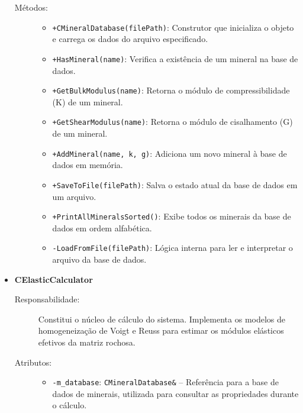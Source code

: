 \begin{itemize}
\begin{description}
        \item[Métodos:]
        \begin{itemize}
            \item \texttt{+CMineralDatabase(filePath)}: Construtor que inicializa o objeto e carrega os dados do arquivo especificado.
            \item \texttt{+HasMineral(name)}: Verifica a existência de um mineral na base de dados.
            \item \texttt{+GetBulkModulus(name)}: Retorna o módulo de compressibilidade (K) de um mineral.
            \item \texttt{+GetShearModulus(name)}: Retorna o módulo de cisalhamento (G) de um mineral.
            \item \texttt{+AddMineral(name, k, g)}: Adiciona um novo mineral à base de dados em memória.
            \item \texttt{+SaveToFile(filePath)}: Salva o estado atual da base de dados em um arquivo.
            \item \texttt{+PrintAllMineralsSorted()}: Exibe todos os minerais da base de dados em ordem alfabética.
            \item \texttt{-LoadFromFile(filePath)}: Lógica interna para ler e interpretar o arquivo da base de dados.
        \end{itemize}
    \end{description}

    \item \textbf{CElasticCalculator}
    \begin{description}
        \item[Responsabilidade:] Constitui o núcleo de cálculo do sistema. Implementa os modelos de homogeneização de Voigt e Reuss para estimar os módulos elásticos efetivos da matriz rochosa.
        
        \item[Atributos:]
        \begin{itemize}
            \item \texttt{-m\_database}: \texttt{CMineralDatabase\&} – Referência para a base de dados de minerais, utilizada para consultar as propriedades durante o cálculo.
        \end{itemize}
        

\end{description}
\end{itemize}
